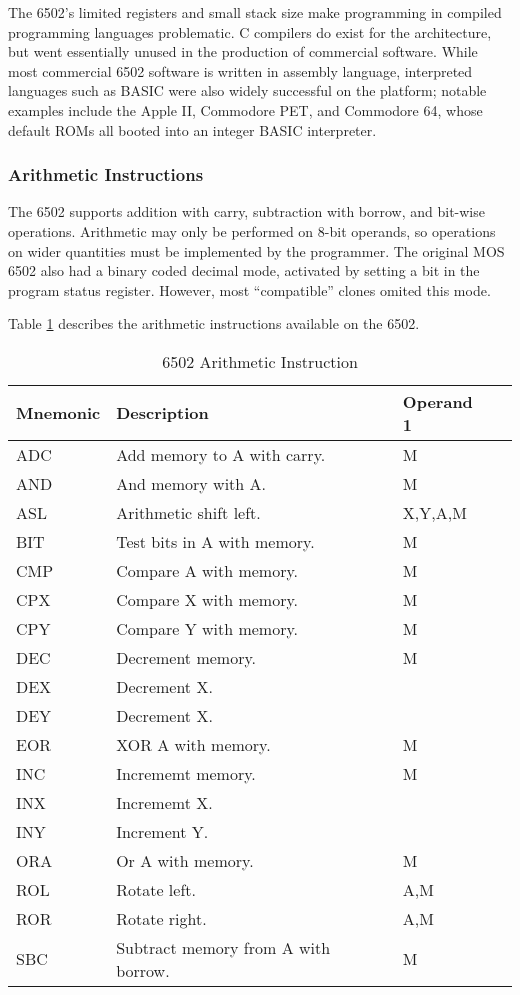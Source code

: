 \documentclass[journal]{IEEEtran}
\begin{document}
The 6502's limited registers and small stack size make programming in compiled
programming languages problematic. C compilers do exist for the architecture,
but went essentially unused in the production of commercial software. While most
commercial 6502 software is written in assembly language, interpreted languages
such as BASIC were also widely successful on the platform; notable examples
include the Apple II, Commodore PET, and Commodore 64, whose default ROMs all
booted into an integer BASIC interpreter.


\subsubsection{Arithmetic Instructions}

The 6502 supports addition with carry, subtraction with borrow, and bit-wise
operations. Arithmetic may only be performed on 8-bit operands, so operations on
wider quantities must be implemented by the programmer. The original MOS 6502
also had a binary coded decimal mode, activated by setting a bit in the program
status register. However, most ``compatible'' clones omited this mode.

Table \ref{arith} describes the arithmetic instructions available on the 6502.

\begin{table}
\centering
\begin{tabular}[H!]{|l|l|l|l|}
\hline
\textbf{Mnemonic} & \textbf{Description} & \textbf{Operand 1} \\
\hline
ADC & Add memory to A with carry. & M \\
AND & And memory with A. & M \\
ASL & Arithmetic shift left. & X,Y,A,M \\
BIT & Test bits in A with memory. & M \\
CMP & Compare A with memory. & M \\
CPX & Compare X with memory. & M \\
CPY & Compare Y with memory. & M \\
DEC & Decrement memory. & M \\
DEX & Decrement X. & \\
DEY & Decrement X. & \\
EOR & XOR A with memory. & M \\
INC & Incrememt memory. & M \\
INX & Incrememt X. & \\
INY & Increment Y. & \\
ORA & Or A with memory. & M \\
ROL & Rotate left. & A,M \\
ROR & Rotate right. & A,M \\
SBC & Subtract memory from A with borrow. & M \\
\hline
\end{tabular}
\caption{6502 Arithmetic Instruction}
\label{arith}
\end{table}
\end{document}
